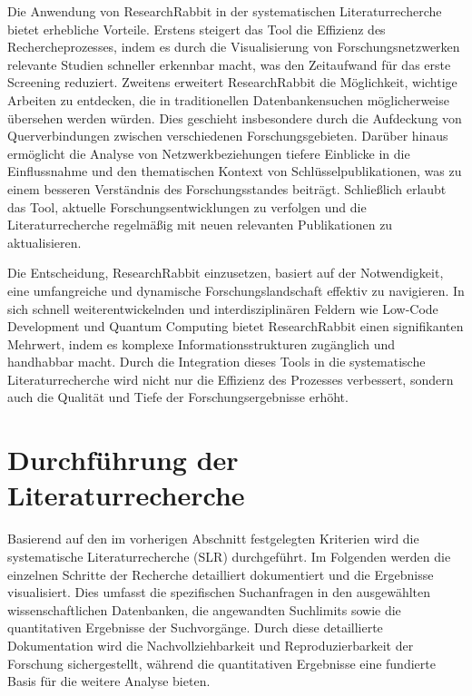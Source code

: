 Die Anwendung von ResearchRabbit in der systematischen Literaturrecherche bietet erhebliche Vorteile. Erstens 
steigert das Tool die Effizienz des Rechercheprozesses, indem es durch die Visualisierung von Forschungsnetzwerken 
relevante Studien schneller erkennbar macht, was den Zeitaufwand für das erste Screening reduziert. Zweitens 
erweitert ResearchRabbit die Möglichkeit, wichtige Arbeiten zu entdecken, die in traditionellen Datenbankensuchen 
möglicherweise übersehen werden würden. Dies geschieht insbesondere durch die Aufdeckung von Querverbindungen 
zwischen verschiedenen Forschungsgebieten. Darüber hinaus ermöglicht die Analyse von Netzwerkbeziehungen 
tiefere Einblicke in die Einflussnahme und den thematischen Kontext von Schlüsselpublikationen, was zu einem 
besseren Verständnis des Forschungsstandes beiträgt. Schließlich erlaubt das Tool, aktuelle Forschungsentwicklungen 
zu verfolgen und die Literaturrecherche regelmäßig mit neuen relevanten Publikationen zu aktualisieren.

Die Entscheidung, ResearchRabbit einzusetzen, basiert auf der Notwendigkeit, eine umfangreiche und 
dynamische Forschungslandschaft effektiv zu navigieren. In sich schnell weiterentwickelnden und interdisziplinären 
Feldern wie Low-Code Development und Quantum Computing bietet ResearchRabbit einen signifikanten Mehrwert, 
indem es komplexe Informationsstrukturen zugänglich und handhabbar macht. Durch die Integration dieses Tools 
in die systematische Literaturrecherche wird nicht nur die Effizienz des Prozesses verbessert, sondern auch 
die Qualität und Tiefe der Forschungsergebnisse erhöht.

\section{Durchführung der Literaturrecherche}
Basierend auf den im vorherigen Abschnitt festgelegten Kriterien wird die systematische Literaturrecherche (SLR) 
durchgeführt. Im Folgenden werden die einzelnen Schritte der Recherche detailliert dokumentiert und die Ergebnisse 
visualisiert. Dies umfasst die spezifischen Suchanfragen in den ausgewählten wissenschaftlichen Datenbanken, die 
angewandten Suchlimits sowie die quantitativen Ergebnisse der Suchvorgänge. Durch diese detaillierte Dokumentation 
wird die Nachvollziehbarkeit und Reproduzierbarkeit der Forschung sichergestellt, während die quantitativen 
Ergebnisse eine fundierte Basis für die weitere Analyse bieten.

